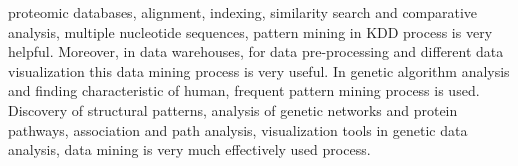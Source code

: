 \documentclass[conference]{IEEEtran}
\begin{document}
proteomic databases, alignment, indexing, similarity search and comparative analysis, multiple nucleotide sequences, pattern mining in KDD process is very helpful. Moreover, in data warehouses, for data pre-processing and different data visualization this data mining process is very useful. In genetic algorithm analysis and finding characteristic of human, frequent pattern mining process is used. Discovery of structural patterns, analysis of genetic networks and protein pathways, association and path analysis, visualization tools in genetic data analysis, data mining is very much effectively used process.
\end{document}
